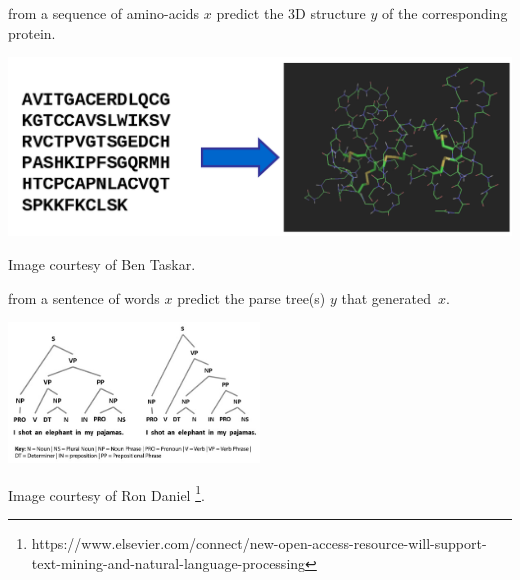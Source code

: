 \begin{appendix}
\begin{example}
from a sequence of amino-acids $x$ predict the 3D structure $y$ of the
corresponding protein.

  \centering
    \includegraphics[scale=0.4]{img/proteinfolding}
    
Image courtesy of Ben Taskar.
\end{example}

\begin{example}
from a sentence of words $x$ predict the parse tree(s) $y$ that generated~$x$.

  \centering
    \includegraphics[width=0.5\textwidth]{img/parsetree}
    
Image courtesy of Ron
Daniel%
\footnote{https://www.elsevier.com/connect/new-open-access-resource-will-support-text-mining-and-natural-language-processing}.
\end{example}
\end{appendix}




